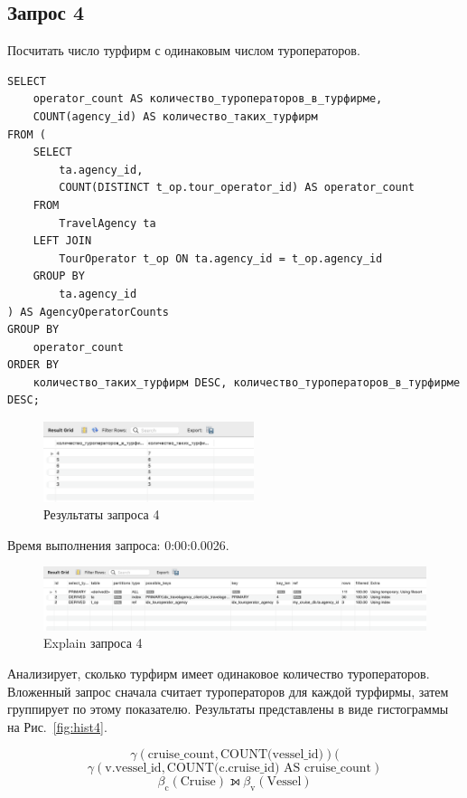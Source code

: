\documentclass[11pt,a4paper,final]{article}
\begin{document}
\subsection{Запрос 4}
Посчитать число турфирм с одинаковым числом туроператоров.
\begin{lstlisting}[style=sqlstyle, label=sql:query1]
SELECT
    operator_count AS количество_туроператоров_в_турфирме,
    COUNT(agency_id) AS количество_таких_турфирм
FROM (
    SELECT
        ta.agency_id,
        COUNT(DISTINCT t_op.tour_operator_id) AS operator_count
    FROM
        TravelAgency ta
    LEFT JOIN
        TourOperator t_op ON ta.agency_id = t_op.agency_id
    GROUP BY
        ta.agency_id
) AS AgencyOperatorCounts
GROUP BY
    operator_count
ORDER BY
    количество_таких_турфирм DESC, количество_туроператоров_в_турфирме DESC;
\end{lstlisting}
\begin{figure}[h!]
    \centering
    \includegraphics[width=0.55\textwidth]{16.png} 
    \caption{Результаты запроса 4}
\end{figure}
{\centering
Время выполнения запроса: 0:00:0.0026.\par}
\begin{figure}[H]
    \centering
    \includegraphics[width=\textwidth]{17.png} 
    \caption{Explain запроса 4}
\end{figure}

Анализирует, сколько турфирм имеет одинаковое количество туроператоров. Вложенный запрос сначала считает туроператоров для каждой турфирмы, затем группирует по этому показателю. Результаты представлены в виде гистограммы на Рис.~\ref{fig:hist4}.

$$
\gamma(\text{cruise\_count}, \text{COUNT(vessel\_id)})(
$$
$$
\gamma(\text{v.vessel\_id}, \text{COUNT(c.cruise\_id) AS cruise\_count})
$$
$$
\beta_{\text{c}}(\text{Cruise}) \leftouterjoin \beta_{\text{v}}(\text{Vessel})
$$
\end{document}
